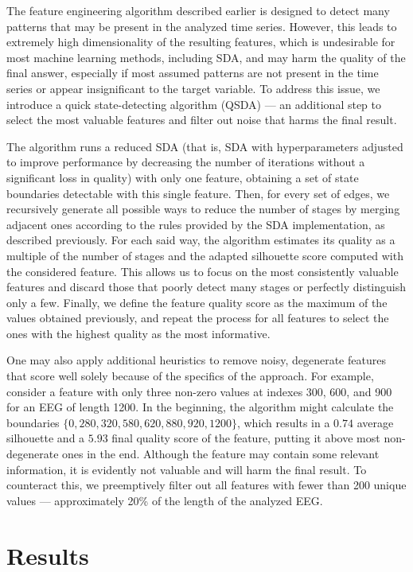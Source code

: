 \documentclass[pdflatex,sn-basic,Numbered]{sn-jnl}
\begin{document}
The feature engineering algorithm described earlier is designed to detect many patterns that may be present in the analyzed time series. However, this leads to extremely high dimensionality of the resulting features, which is undesirable for most machine learning methods, including SDA, and may harm the quality of the final answer, especially if most assumed patterns are not present in the time series or appear insignificant to the target variable. To address this issue, we introduce a quick state-detecting algorithm (QSDA) --- an additional step to select the most valuable features and filter out noise that harms the final result. 

The algorithm runs a reduced SDA (that is, SDA with hyperparameters adjusted to improve performance by decreasing the number of iterations without a significant loss in quality) with only one feature, obtaining a set of state boundaries detectable with this single feature. Then, for every set of edges, we recursively generate all possible ways to reduce the number of stages by merging adjacent ones according to the rules provided by the SDA implementation, as described previously. For each said way, the algorithm estimates its quality as a multiple of the number of stages and the adapted silhouette score computed with the considered feature. This allows us to focus on the most consistently valuable features and discard those that poorly detect many stages or perfectly distinguish only a few. Finally, we define the feature quality score as the maximum of the values obtained previously, and repeat the process for all features to select the ones with the highest quality as the most informative.

One may also apply additional heuristics to remove noisy, degenerate features that score well solely because of the specifics of the approach. For example, consider a feature with only three non-zero values at indexes 300, 600, and 900 for an EEG of length 1200. In the beginning, the algorithm might calculate the boundaries $\{ 0, 280, 320, 580, 620, 880, 920, 1200 \}$, which results in a $0.74$ average silhouette and a $5.93$ final quality score of the feature, putting it above most non-degenerate ones in the end. Although the feature may contain some relevant information, it is evidently not valuable and will harm the final result. To counteract this, we preemptively filter out all features with fewer than 200 unique values --- approximately 20\% of the length of the analyzed EEG.\@

\section{Results}
\end{document}
